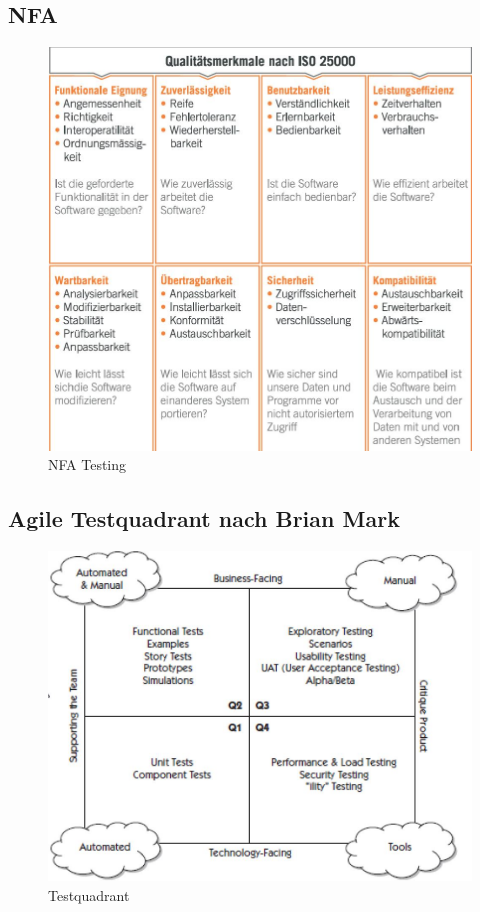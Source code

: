 \subsection{NFA}

\begin{figure}[h!]
\centering
\includegraphics[width=0.7\linewidth]{fig/nfa-testing}
\caption{NFA Testing}
\label{fig:nfa-testing}
\end{figure}

\subsection{Agile Testquadrant nach Brian Mark}

\begin{figure}[h!]
\centering
\includegraphics[width=0.5\linewidth]{fig/testquadrant}
\caption{Testquadrant}
\label{fig:testquadrant}
\end{figure}

